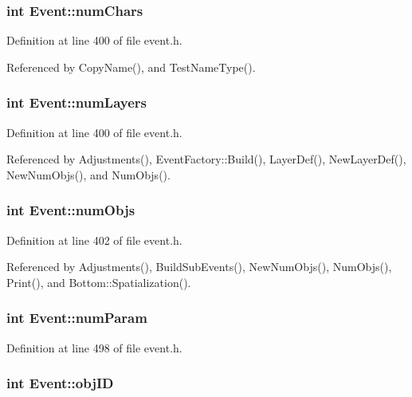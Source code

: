 \subsubsection{\setlength{\rightskip}{0pt plus 5cm}int {\bf Event::num\-Chars}}\label{classEvent_o18}




Definition at line 400 of file event.h.

Referenced by Copy\-Name(), and Test\-Name\-Type().
\subsubsection{\setlength{\rightskip}{0pt plus 5cm}int {\bf Event::num\-Layers}}\label{classEvent_o13}




Definition at line 400 of file event.h.

Referenced by Adjustments(), Event\-Factory::Build(), Layer\-Def(), New\-Layer\-Def(), New\-Num\-Objs(), and Num\-Objs().
\subsubsection{\setlength{\rightskip}{0pt plus 5cm}int {\bf Event::num\-Objs}}\label{classEvent_o21}




Definition at line 402 of file event.h.

Referenced by Adjustments(), Build\-Sub\-Events(), New\-Num\-Objs(), Num\-Objs(), Print(), and Bottom::Spatialization().
\subsubsection{\setlength{\rightskip}{0pt plus 5cm}int {\bf Event::num\-Param}}\label{classEvent_o49}




Definition at line 498 of file event.h.
\subsubsection{\setlength{\rightskip}{0pt plus 5cm}int {\bf Event::obj\-ID}}\label{classEvent_o22}




